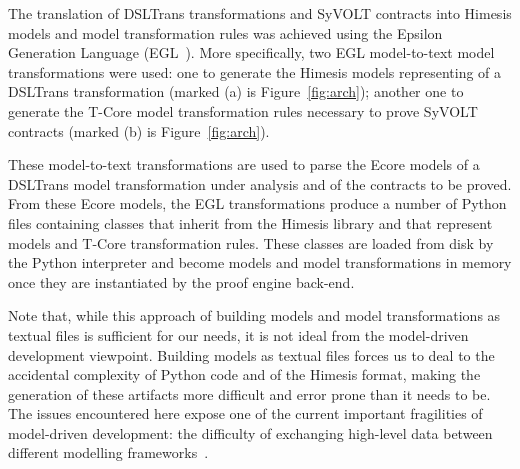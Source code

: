 The translation of DSLTrans transformations and SyVOLT contracts into Himesis
models and model transformation rules was achieved using the Epsilon Generation
Language (EGL~\cite{Rose2008}). More specifically, two EGL model-to-text model
transformations were used: one to generate the Himesis models representing of a DSLTrans transformation (marked (a) is
Figure~\ref{fig:arch}); another one to generate the T-Core model transformation
rules necessary to prove SyVOLT contracts (marked (b) is Figure~\ref{fig:arch}).

These model-to-text transformations are used to parse the Ecore models of a
DSLTrans model transformation under analysis and of the contracts to be proved.
From these Ecore models, the EGL transformations produce a number of Python
files containing classes that inherit from the Himesis library and that
represent models and T-Core transformation rules. These classes are loaded from
disk by the Python interpreter and become models and model transformations in
memory once they are instantiated by the proof engine back-end.

Note that, while this approach of building models and model transformations as
textual files is sufficient for our needs, it is not ideal from the model-driven
development viewpoint. Building models as textual files forces us to deal to
the accidental complexity of Python code and of the Himesis format, making the
generation of these artifacts more difficult and error prone than it needs to
be. The issues encountered here expose one of the current important fragilities
of model-driven development: the difficulty of exchanging high-level data
between different modelling frameworks~.



